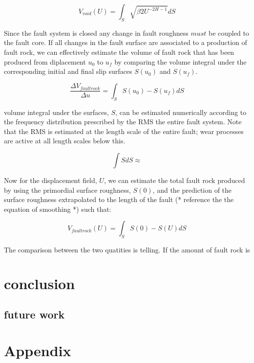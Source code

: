 \documentclass[12pt,a4paper]{article}
\begin{document}
\begin{equation}
	V_{void}(U) = \int_S \sqrt{\beta 2U^{-2H-1}}dS
\end{equation}

Since the fault system is closed any change in fault roughness $must$ be coupled to the fault core. If all changes in the fault surface are associated to a production of fault rock, we can effectively estimate the volume of fault rock that has been produced from diplacement $u_0$ to $u_f$ by comparing the volume integral under the corresponding initial and final slip surfaces $S(u_0)$ and $S(u_f)$.

\begin{equation}
	\dfrac {\Delta V_{fault rock}}{\Delta u} = \int_S S(u_0) - S(u_f) dS
\end{equation}

volume integral under the surfaces, $S$, can be estimated numerically according to the frequency distribution prescribed by the RMS the  entire fault system. Note that the RMS is estimated at the length scale of the entire fault; wear processes are active at all length scales below this.

\begin{equation}
	\int S dS \approx 
\end{equation}

Now for the displacement field, $U$, we can estimate the total fault rock produced by using the primordial surface roughness, $S(0)$, and the prediction of the surface roughness extrapolated to the length of the fault (* reference the the equation of smoothing *) such that:

\begin{equation}
	V_{fault rock}(U) = \int_S S(0)-S(U)dS
\end{equation}

The comparison between the two quatities is telling. If the amount of fault rock is

\section{conclusion}
	\subsection{future work}





\section{Appendix}
\end{document}
